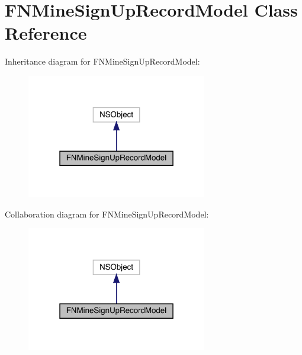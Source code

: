 \hypertarget{interface_f_n_mine_sign_up_record_model}{}\section{F\+N\+Mine\+Sign\+Up\+Record\+Model Class Reference}
\label{interface_f_n_mine_sign_up_record_model}


Inheritance diagram for F\+N\+Mine\+Sign\+Up\+Record\+Model\+:\nopagebreak
\begin{figure}[H]
\begin{center}
\leavevmode
\includegraphics[width=223pt]{interface_f_n_mine_sign_up_record_model__inherit__graph}
\end{center}
\end{figure}


Collaboration diagram for F\+N\+Mine\+Sign\+Up\+Record\+Model\+:\nopagebreak
\begin{figure}[H]
\begin{center}
\leavevmode
\includegraphics[width=223pt]{interface_f_n_mine_sign_up_record_model__coll__graph}
\end{center}
\end{figure}
